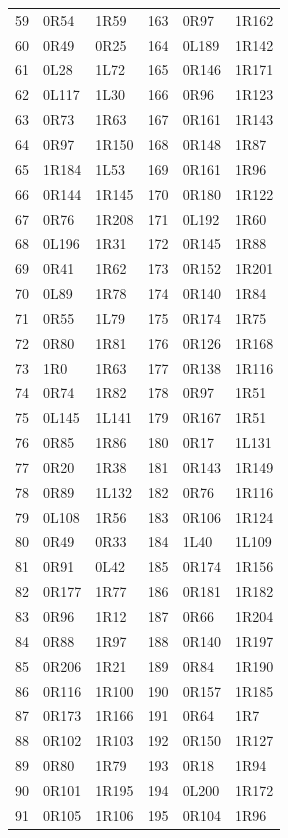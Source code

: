 \begin{longtable}{@{}rll@{\hspace{24pt}}rll@{}}
59 & 0R54 & 1R59 & 163 & 0R97 & 1R162\\
60 & 0R49 & 0R25 & 164 & 0L189 & 1R142\\
61 & 0L28 & 1L72 & 165 & 0R146 & 1R171\\
62 & 0L117 & 1L30 & 166 & 0R96 & 1R123\\
63 & 0R73 & 1R63 & 167 & 0R161 & 1R143\\
64 & 0R97 & 1R150 & 168 & 0R148 & 1R87\\
65 & 1R184 & 1L53 & 169 & 0R161 & 1R96\\
66 & 0R144 & 1R145 & 170 & 0R180 & 1R122\\
67 & 0R76 & 1R208 & 171 & 0L192 & 1R60\\
68 & 0L196 & 1R31 & 172 & 0R145 & 1R88\\
69 & 0R41 & 1R62 & 173 & 0R152 & 1R201\\
70 & 0L89 & 1R78 & 174 & 0R140 & 1R84\\
71 & 0R55 & 1L79 & 175 & 0R174 & 1R75\\
72 & 0R80 & 1R81 & 176 & 0R126 & 1R168\\
73 & 1R0 & 1R63 & 177 & 0R138 & 1R116\\
74 & 0R74 & 1R82 & 178 & 0R97 & 1R51\\
75 & 0L145 & 1L141 & 179 & 0R167 & 1R51\\
76 & 0R85 & 1R86 & 180 & 0R17 & 1L131\\
77 & 0R20 & 1R38 & 181 & 0R143 & 1R149\\
78 & 0R89 & 1L132 & 182 & 0R76 & 1R116\\
79 & 0L108 & 1R56 & 183 & 0R106 & 1R124\\
80 & 0R49 & 0R33 & 184 & 1L40 & 1L109\\
81 & 0R91 & 0L42 & 185 & 0R174 & 1R156\\
82 & 0R177 & 1R77 & 186 & 0R181 & 1R182\\
83 & 0R96 & 1R12 & 187 & 0R66 & 1R204\\
84 & 0R88 & 1R97 & 188 & 0R140 & 1R197\\
85 & 0R206 & 1R21 & 189 & 0R84 & 1R190\\
86 & 0R116 & 1R100 & 190 & 0R157 & 1R185\\
87 & 0R173 & 1R166 & 191 & 0R64 & 1R7\\
88 & 0R102 & 1R103 & 192 & 0R150 & 1R127\\
89 & 0R80 & 1R79 & 193 & 0R18 & 1R94\\
90 & 0R101 & 1R195 & 194 & 0L200 & 1R172\\
91 & 0R105 & 1R106 & 195 & 0R104 & 1R96\\

\end{longtable}
